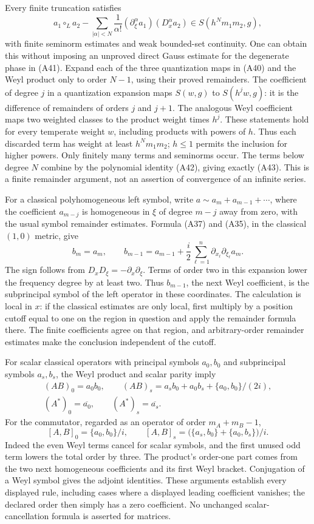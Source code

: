 \documentclass[
  11pt,
]{article}
\begin{document}
Every finite truncation satisfies \[
a_1\circ_L a_2-
\sum_{|\alpha|<N}\frac{1}{\alpha!}
(\partial_\xi^\alpha a_1)(D_x^\alpha a_2)
\in S(h^Nm_1m_2,g),
\tag{A43}
\] with finite seminorm estimates and weak bounded-set continuity. One
can obtain this without imposing an unproved direct Gauss estimate for
the degenerate phase in (A41). Expand each of the three quantization
maps in (A40) and the Weyl product only to order \(N-1\), using their
proved remainders. The coefficient of degree \(j\) in a quantization
expansion maps \(S(w,g)\) to \(S(h^jw,g)\): it is the difference of
remainders of orders \(j\) and \(j+1\). The analogous Weyl coefficient
maps two weighted classes to the product weight times \(h^j\). These
statements hold for every temperate weight \(w\), including products
with powers of \(h\). Thus each discarded term has weight at least
\(h^N m_1m_2\); \(h\le1\) permits the inclusion for higher powers. Only
finitely many terms and seminorms occur. The terms below degree \(N\)
combine by the polynomial identity (A42), giving exactly (A43). This is
a finite remainder argument, not an assertion of convergence of an
infinite series.

For a classical polyhomogeneous left symbol, write
\(a\sim a_m+a_{m-1}+\cdots\), where the coefficient \(a_{m-j}\) is
homogeneous in \(\xi\) of degree \(m-j\) away from zero, with the usual
symbol remainder estimates. Formula (A37) and (A35), in the classical
\((1,0)\) metric, give \[
b_m=a_m,\qquad
b_{m-1}=a_{m-1}+\frac{i}{2}
\sum_{\ell=1}^n\partial_{x_\ell}\partial_{\xi_\ell}a_m.
\tag{A44}
\] The sign follows from \(D_xD_\xi=-\partial_x\partial_\xi\). Terms of
order two in this expansion lower the frequency degree by at least two.
Thus \(b_{m-1}\), the next Weyl coefficient, is the subprincipal symbol
of the left operator in these coordinates. The calculation is local in
\(x\): if the classical estimates are only local, first multiply by a
position cutoff equal to one on the region in question and apply the
remainder formula there. The finite coefficients agree on that region,
and arbitrary-order remainder estimates make the conclusion independent
of the cutoff.

For scalar classical operators with principal symbols \(a_0,b_0\) and
subprincipal symbols \(a_s,b_s\), the Weyl product and scalar parity
imply \[
\begin{gathered}
(AB)_0=a_0b_0,\qquad
(AB)_s=a_sb_0+a_0b_s+\{a_0,b_0\}/(2i),\\
(A^*)_0=\overline{a_0},\qquad (A^*)_s=\overline{a_s}.
\end{gathered}
\tag{A45}
\] For the commutator, regarded as an operator of order \(m_A+m_B-1\),
\[
[A,B]_0=\{a_0,b_0\}/i,\qquad
[A,B]_s=\big(\{a_s,b_0\}+\{a_0,b_s\}\big)/i.
\tag{A46}
\] Indeed the even Weyl terms cancel for scalar symbols, and the first
unused odd term lowers the total order by three. The product's order-one
part comes from the two next homogeneous coefficients and its first Weyl
bracket. Conjugation of a Weyl symbol gives the adjoint identities.
These arguments establish every displayed rule, including cases where a
displayed leading coefficient vanishes; the declared order then simply
has a zero coefficient. No unchanged scalar-cancellation formula is
asserted for matrices.
\end{document}
